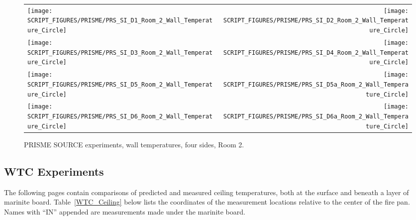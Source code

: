 \begin{figure}[p]
\begin{tabular*}{\textwidth}{l@{\extracolsep{\fill}}r}
\texttt{[image: SCRIPT\_FIGURES/PRISME/PRS\_SI\_D1\_Room\_2\_Wall\_Temperature\_Circle]} &
\texttt{[image: SCRIPT\_FIGURES/PRISME/PRS\_SI\_D2\_Room\_2\_Wall\_Temperature\_Circle]} \\
\texttt{[image: SCRIPT\_FIGURES/PRISME/PRS\_SI\_D3\_Room\_2\_Wall\_Temperature\_Circle]} &
\texttt{[image: SCRIPT\_FIGURES/PRISME/PRS\_SI\_D4\_Room\_2\_Wall\_Temperature\_Circle]} \\
\texttt{[image: SCRIPT\_FIGURES/PRISME/PRS\_SI\_D5\_Room\_2\_Wall\_Temperature\_Circle]} &
\texttt{[image: SCRIPT\_FIGURES/PRISME/PRS\_SI\_D5a\_Room\_2\_Wall\_Temperature\_Circle]} \\
\texttt{[image: SCRIPT\_FIGURES/PRISME/PRS\_SI\_D6\_Room\_2\_Wall\_Temperature\_Circle]} &
\texttt{[image: SCRIPT\_FIGURES/PRISME/PRS\_SI\_D6a\_Room\_2\_Wall\_Temperature\_Circle]}
\end{tabular*}
\caption[PRISME SOURCE experiments, wall temperatures, four sides, Room 2]{PRISME SOURCE experiments, wall temperatures, four sides, Room 2.}
\label{PRISME_SOURCE_Wall_Circle_Room_2}
\end{figure}

\clearpage


\subsection{WTC Experiments}

The following pages contain comparisons of predicted and measured ceiling temperatures, both at the surface and beneath a layer of marinite board. Table~\ref{WTC_Ceiling} below lists the coordinates of the measurement locations relative to the center of the fire pan. Names with ``IN'' appended are measurements made under the marinite board.


